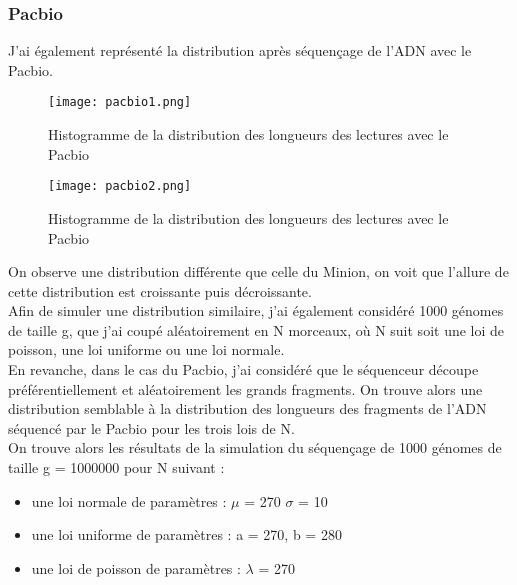 \documentclass[11pt,a4paper]{article} %
\begin{document}
\subsubsection{Pacbio}   
J'ai également représenté la distribution après séquençage de l'ADN avec le Pacbio.\\
\begin{figure}[h]
    \begin{minipage}[c]{.46\linewidth}
        \centering
        \texttt{[image: pacbio1.png]}
        \caption{\small Histogramme de la distribution des longueurs des lectures avec le Pacbio}
    \end{minipage}
    \hfill%
    \begin{minipage}[c]{.46\linewidth}
        \centering
        \texttt{[image: pacbio2.png]}
        \caption{\small Histogramme de la distribution des longueurs des lectures avec le Pacbio}
    \end{minipage}
\end{figure} 



On observe une distribution différente que celle du Minion, on voit que l'allure de cette distribution est croissante puis décroissante.\\
Afin de simuler une distribution similaire, j'ai également considéré 1000 génomes de taille g, que j'ai coupé aléatoirement en N morceaux, où N suit soit une loi de poisson, une loi uniforme ou une loi normale.\\
En revanche, dans le cas du Pacbio, j'ai considéré que le séquenceur découpe préférentiellement et aléatoirement les grands fragments. On trouve alors une distribution semblable à la distribution des longueurs des fragments de l'ADN séquencé par le Pacbio pour les trois lois de N.\\ 
On trouve alors les résultats de la simulation du séquençage de 1000 génomes de taille g = 1000000 pour N suivant : \\
\begin{itemize}
\item une loi normale de paramètres : $\mu$ = 270 $\sigma$ = 10
\item une loi uniforme de paramètres : a = 270, b = 280
\item une loi de poisson de paramètres : $\lambda$ = 270 \\
\end{itemize}
\end{document}
